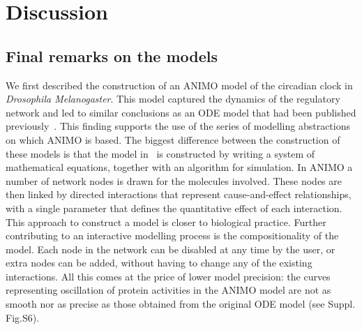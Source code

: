 \documentclass{bmcart}
\begin{document}
\section*{Discussion}
\subsection*{Final remarks on the models}
We first described the construction of an ANIMO
model of the circadian clock in \emph{Drosophila Melanogaster}. This model
captured the dynamics of the regulatory network and led to similar
conclusions as an ODE model that had been
published previously~\cite{drosophila-ode-model}. This finding supports the use of
the series of modelling abstractions on which ANIMO is based. The biggest
difference between the construction of these models is that the model in~\cite{drosophila-ode-model}
is constructed by writing a system of mathematical equations, together
with an algorithm for simulation. In ANIMO a number of network
nodes is drawn for the molecules involved.
These nodes are then linked by directed
interactions that represent cause-and-effect relationships, with a single parameter
that defines the quantitative effect of each
interaction. This approach to construct a model is closer to biological practice.
Further contributing to an interactive modelling process
is the compositionality of the model. Each node in the network
can be disabled at any time by the user, or extra nodes can be added,
without having to change any of the existing interactions.
All this comes at the price of lower model precision: the curves representing
oscillation of protein activities in the ANIMO model are not as smooth
nor as precise as those obtained from the original ODE model (see Suppl. Fig.S6). %
\end{document}
